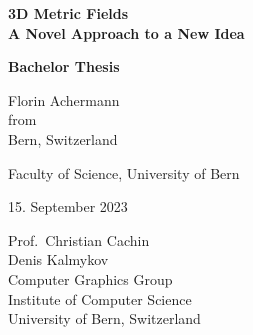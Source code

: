 \documentclass[a4paper,twoside,openright,11pt]{report}
\newcommand{\thesistitle}{3D Metric Fields}
\newcommand{\thesisauthor}{Florin Achermann}
\newcommand{\thesisauthororigin}{Bern, Switzerland}
\newcommand{\thesisleiter}{Prof.\ Christian Cachin}
\newcommand{\thesisasst}{Denis Kalmykov}
\newcommand{\thesissubtitle}{A Novel Approach to a New Idea}
\newcommand{\thesisdate}{15. September 2023}
\begin{document}

\begin{titlepage}  
  \thispagestyle{empty}

  \begin{center}  
    \begin{figure}[t]  
      \vspace{1in}     
    \end{figure}
    
    {\bfseries\Huge \thesistitle \\[2mm]
      \Large \thesissubtitle}\\
    \vspace{1.5cm}

    {\bfseries\LARGE Bachelor Thesis}\\
    \vspace{1.5cm}
    
    {\Large \thesisauthor\\[2mm]
      from\\[2mm]
      \thesisauthororigin}\\
    \vspace{1.5cm}

    {\Large Faculty of Science, University of Bern}\\
    \vspace{1.5cm}

    {\Large \thesisdate}\\
    \vspace{1.5cm}

    \vspace*{\fill}
    {\Large
      \thesisleiter\\
      \thesisasst\\
      Computer Graphics Group\\
      Institute of Computer Science\\
      University of Bern, Switzerland\\}
  \end{center}
\end{titlepage}
\end{document}
